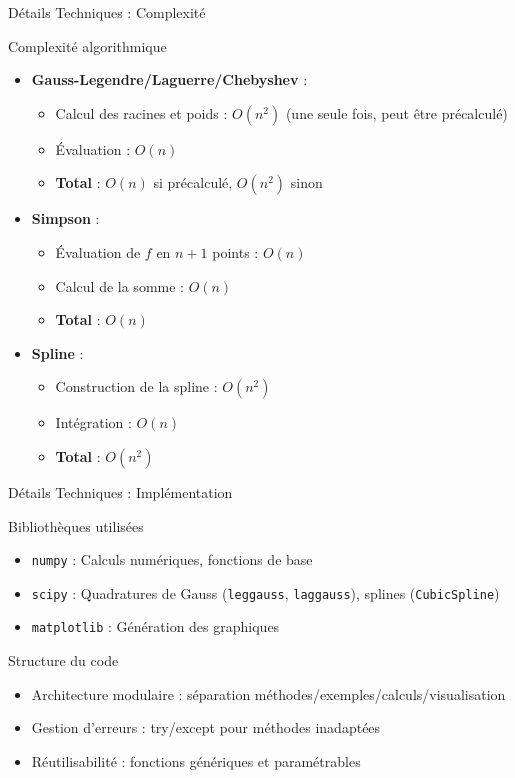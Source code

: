 \documentclass[aspectratio=169,11pt]{beamer}
\begin{document}
\appendix

\begin{frame}{Détails Techniques : Complexité}
\begin{block}{Complexité algorithmique}
\begin{itemize}
\item \textbf{Gauss-Legendre/Laguerre/Chebyshev} :
\begin{itemize}
\item Calcul des racines et poids : $O(n^2)$ (une seule fois, peut être précalculé)
\item Évaluation : $O(n)$
\item \textbf{Total} : $O(n)$ si précalculé, $O(n^2)$ sinon
\end{itemize}
\item \textbf{Simpson} :
\begin{itemize}
\item Évaluation de $f$ en $n+1$ points : $O(n)$
\item Calcul de la somme : $O(n)$
\item \textbf{Total} : $O(n)$
\end{itemize}
\item \textbf{Spline} :
\begin{itemize}
\item Construction de la spline : $O(n^2)$
\item Intégration : $O(n)$
\item \textbf{Total} : $O(n^2)$
\end{itemize}
\end{itemize}
\end{block}
\end{frame}

\begin{frame}{Détails Techniques : Implémentation}
\begin{block}{Bibliothèques utilisées}
\begin{itemize}
\item \texttt{numpy} : Calculs numériques, fonctions de base
\item \texttt{scipy} : Quadratures de Gauss (\texttt{leggauss}, \texttt{laggauss}), splines (\texttt{CubicSpline})
\item \texttt{matplotlib} : Génération des graphiques
\end{itemize}
\end{block}

\begin{block}{Structure du code}
\begin{itemize}
\item Architecture modulaire : séparation méthodes/exemples/calculs/visualisation
\item Gestion d'erreurs : try/except pour méthodes inadaptées
\item Réutilisabilité : fonctions génériques et paramétrables
\end{itemize}
\end{block}
\end{frame}

\end{document}
